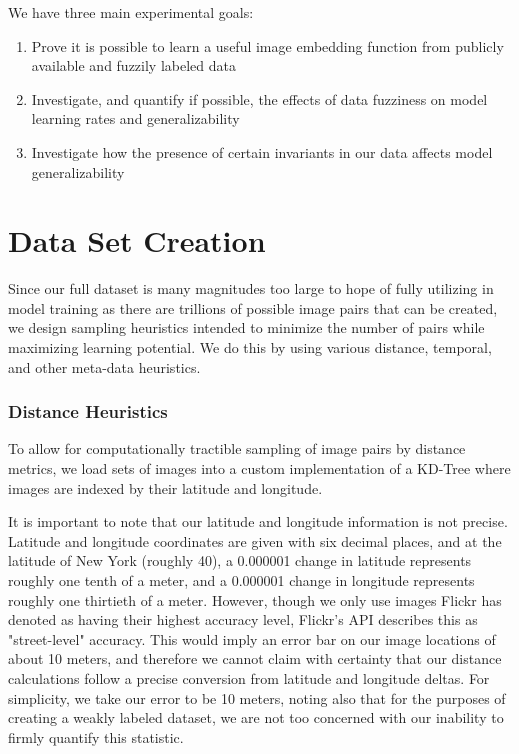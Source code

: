We have three main experimental goals:
\begin{enumerate}
	\item Prove it is possible to learn a useful image embedding function from publicly available and fuzzily labeled data
	\item Investigate, and quantify if possible, the effects of data fuzziness on model learning rates and generalizability
	\item Investigate how the presence of certain invariants in our data affects model generalizability
\end{enumerate}

\section{Data Set Creation}
Since our full dataset is many magnitudes too large to hope of fully utilizing in model training as there are trillions of possible image pairs that can be created, we design sampling heuristics intended to minimize the number of pairs while maximizing learning potential. We do this by using various distance, temporal, and other meta-data heuristics.

\subsubsection{Distance Heuristics}
To allow for computationally tractible sampling of image pairs by distance metrics, we load sets of images into a custom implementation of a KD-Tree where images are indexed by their latitude and longitude.

It is important to note that our latitude and longitude information is not precise. Latitude and longitude coordinates are given with six decimal places, and at the latitude of New York (roughly 40), a 0.000001 change in latitude represents roughly one tenth of a meter, and a 0.000001 change in longitude represents roughly one thirtieth of a meter. However, though we only use images Flickr has denoted as having their highest accuracy level, Flickr's API describes this as "street-level" accuracy. This would imply an error bar on our image locations of about 10 meters, and therefore we cannot claim with certainty that our distance calculations follow a precise conversion from latitude and longitude deltas. For simplicity, we take our error to be 10 meters, noting also that for the purposes of creating a weakly labeled dataset, we are not too concerned with our inability to firmly quantify this statistic.

